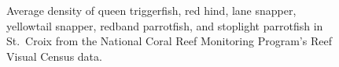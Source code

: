\documentclass[
  letterpaper,
  oneside,
  open=any]{scrbook}
\begin{document}
\begin{figure}


\caption{\label{fig-RVCSTX}Average density of queen triggerfish, red
hind, lane snapper, yellowtail snapper, redband parrotfish, and
stoplight parrotfish in St.~Croix from the National Coral Reef
Monitoring Program's Reef Visual Census data.}

\end{figure}%
\end{document}
